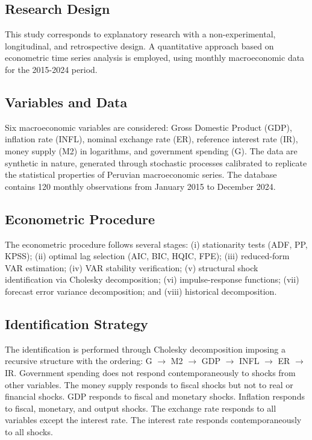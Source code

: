 \documentclass[12pt, a4paper]{article}
\begin{document}
\subsection{Research Design}

This study corresponds to explanatory research with a non-experimental, longitudinal, and retrospective design. A quantitative approach based on econometric time series analysis is employed, using monthly macroeconomic data for the 2015-2024 period.

\subsection{Variables and Data}

Six macroeconomic variables are considered: Gross Domestic Product (GDP), inflation rate (INFL), nominal exchange rate (ER), reference interest rate (IR), money supply (M2) in logarithms, and government spending (G). The data are synthetic in nature, generated through stochastic processes calibrated to replicate the statistical properties of Peruvian macroeconomic series. The database contains 120 monthly observations from January 2015 to December 2024.

\subsection{Econometric Procedure}

The econometric procedure follows several stages: (i) stationarity tests (ADF, PP, KPSS); (ii) optimal lag selection (AIC, BIC, HQIC, FPE); (iii) reduced-form VAR estimation; (iv) VAR stability verification; (v) structural shock identification via Cholesky decomposition; (vi) impulse-response functions; (vii) forecast error variance decomposition; and (viii) historical decomposition.

\subsection{Identification Strategy}

The identification is performed through Cholesky decomposition imposing a recursive structure with the ordering: G $\rightarrow$ M2 $\rightarrow$ GDP $\rightarrow$ INFL $\rightarrow$ ER $\rightarrow$ IR. Government spending does not respond contemporaneously to shocks from other variables. The money supply responds to fiscal shocks but not to real or financial shocks. GDP responds to fiscal and monetary shocks. Inflation responds to fiscal, monetary, and output shocks. The exchange rate responds to all variables except the interest rate. The interest rate responds contemporaneously to all shocks.
\end{document}
